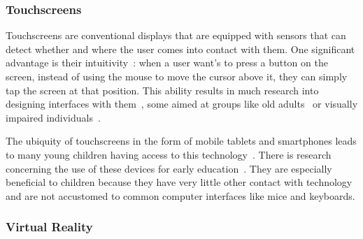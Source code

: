 \subsubsection{Touchscreens}

Touchscreens are conventional displays that are equipped with sensors that can detect whether and where the user comes into contact with them. One significant advantage is their intuitivity~\cite{touchEvaluation}: when a user want's to press a button on the screen, instead of using the mouse to move the cursor above it, they can simply tap the screen at that position. This ability results in much research into designing interfaces with them~\cite{touchM3, touchDesign}, some aimed at groups like old adults~\cite{touchInterfacesOld, touchInterfacesOld2, touchInterfacesOld3} or visually impaired individuals~\cite{touchVisualImpairment, touchVisualImpairment2, touchVisualImpairment3}.

The ubiquity of touchscreens in the form of mobile tablets and smartphones leads to many young children having access to this technology~\cite{youngChildrenTouchscreens}. There is research concerning the use of these devices for early education~\cite{touchscreenChildrenLearning, touchBenefitsDamagesKids}. They are especially beneficial to children because they have very little other contact with technology and are not accustomed to common computer interfaces like mice and keyboards.

\subsubsection{Virtual Reality}


